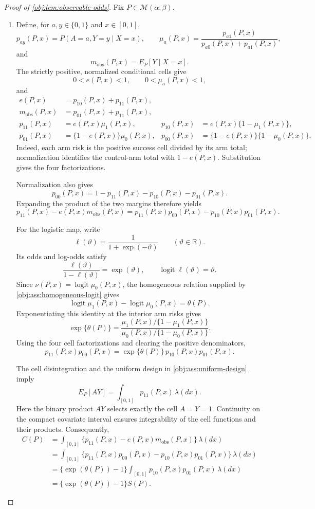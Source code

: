 \begin{proof}[Proof of \cref{obj:lem:observable-odds}]
Fix \(P\in\mathcal M(\alpha,\beta)\).

\begin{enumerate}
\item Define, for \(a,y\in\{0,1\}\) and \(x\in[0,1]\),
\[
p_{ay}(P,x)=P(A=a,Y=y\mid X=x),\qquad
\mu_a(P,x)=\frac{p_{a1}(P,x)}{p_{a0}(P,x)+p_{a1}(P,x)},
\]
and
\[
m_{\mathrm{obs}}(P,x)=E_P[Y\mid X=x].
\]
The strictly positive, normalized conditional cells give
\[
0<e(P,x)<1,\qquad 0<\mu_a(P,x)<1,
\]
and
\[
\begin{aligned}
e(P,x)&=p_{10}(P,x)+p_{11}(P,x),\\
m_{\mathrm{obs}}(P,x)&=p_{01}(P,x)+p_{11}(P,x),\\
p_{11}(P,x)&=e(P,x)\mu_1(P,x),&
p_{10}(P,x)&=e(P,x)\{1-\mu_1(P,x)\},\\
p_{01}(P,x)&=\{1-e(P,x)\}\mu_0(P,x),&
p_{00}(P,x)&=\{1-e(P,x)\}\{1-\mu_0(P,x)\}.
\end{aligned}
\]
Indeed, each arm risk is the positive success cell divided by its arm total; normalization identifies the control-arm total with \(1-e(P,x)\). Substitution gives the four factorizations.

Normalization also gives
\[
p_{00}(P,x)=1-p_{11}(P,x)-p_{10}(P,x)-p_{01}(P,x).
\]
Expanding the product of the two margins therefore yields
\[
p_{11}(P,x)-e(P,x)m_{\mathrm{obs}}(P,x)
=p_{11}(P,x)p_{00}(P,x)-p_{10}(P,x)p_{01}(P,x).
\]

For the logistic map, write
\[
\ell(\vartheta)=\frac{1}{1+\exp(-\vartheta)}
\qquad(\vartheta\in\mathbb R).
\]
Its odds and log-odds satisfy
\[
\frac{\ell(\vartheta)}{1-\ell(\vartheta)}=\exp(\vartheta),
\qquad
\operatorname{logit}\ell(\vartheta)=\vartheta.
\]
Since \(\nu(P,x)=\operatorname{logit}\mu_0(P,x)\), the homogeneous relation supplied by \cref{obj:ass:homogeneous-logit} gives
\[
\operatorname{logit}\mu_1(P,x)
-\operatorname{logit}\mu_0(P,x)=\theta(P).
\]
Exponentiating this identity at the interior arm risks gives
\[
\exp\{\theta(P)\}
=
\frac{\mu_1(P,x)/\{1-\mu_1(P,x)\}}
     {\mu_0(P,x)/\{1-\mu_0(P,x)\}}.
\]
Using the four cell factorizations and clearing the positive denominators,
\[
p_{11}(P,x)p_{00}(P,x)
=\exp\{\theta(P)\}\,p_{10}(P,x)p_{01}(P,x).
\]

The cell disintegration and the uniform design in \cref{obj:ass:uniform-design} imply
\[
E_P[AY]=\int_{[0,1]}p_{11}(P,x)\,\lambda(dx).
\]
Here the binary product \(AY\) selects exactly the cell \(A=Y=1\). Continuity on the compact covariate interval ensures integrability of the cell functions and their products. Consequently,
\[
\begin{aligned}
C(P)
&=\int_{[0,1]}
 \{p_{11}(P,x)-e(P,x)m_{\mathrm{obs}}(P,x)\}\,\lambda(dx)\\
&=\int_{[0,1]}
 \{p_{11}(P,x)p_{00}(P,x)-p_{10}(P,x)p_{01}(P,x)\}\,\lambda(dx)\\
&=\{\exp(\theta(P))-1\}
  \int_{[0,1]}p_{10}(P,x)p_{01}(P,x)\,\lambda(dx)\\
&=\{\exp(\theta(P))-1\}S(P).
\end{aligned}
\]


\end{enumerate}
\end{proof}
